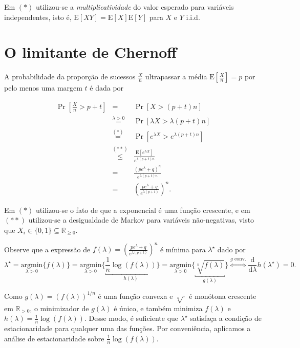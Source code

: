 \documentclass{article}
\begin{document}
Em \((*)\) utilizou-se a \emph{multiplicatividade} do valor esperado para variáveis independentes, isto é, \(\mathrm{E}\left[XY\right] = \mathrm{E}\left[X\right]\mathrm{E}\left[Y\right]\) para \(X\) e \(Y\) i.i.d. 

\newpage

\section*{O limitante de Chernoff}

A probabilidade da proporção de sucessos \(\frac{X}{n}\) ultrapassar a média \(\mathrm E\left[\frac{X}{n}\right] = p\) por pelo menos uma margem \(t\) é dada por

\begin{equation}\label{calc:prob}
	\begin{array}{rcl}
		\Pr\left[\frac{X}{n} > p + t\right] & = & \Pr[X > (p+t)n]\\[1em]
		& \overset{\lambda > 0}{=} & \Pr\left[\lambda X > \lambda (p+t)n\right]\\[1em]
		& \overset{(*)}{=} & \Pr\left[e^{\lambda X} > e^{ \lambda (p+t) n}\right]\\[1em]
		& \overset{(**)}{\leq} & \frac{\mathrm E \left[e^{\lambda X}\right]}{ e^{\lambda(p+t)n}}\\[1em]
		& = & \frac{\left(pe^{\lambda}+q\right)^n}{e^{\lambda(p+t)n}}\\[1em]
		& = & \left(\frac{pe^{\lambda}+q}{e^{\lambda(p+t)}}\right)^n.
	\end{array}
\end{equation}

Em \((*)\) utilizou-se o fato de que a exponencial é uma função crescente, e em \((**)\) utilizou-se a desigualdade de Markov para variáveis não-negativas, visto que \(X_i\in\{0,1\}\subseteq\mathbb{R}_{\geq 0}\).

Observe que a expressão de \(f(\lambda) = \left(\frac{pe^\lambda+q}{e^{\lambda(p+t)}}\right)^n\) é mínima para \(\lambda^\star\) dado por
\[
\lambda^\star = \underset{\lambda > 0}{\mathrm{argmin}}\{f(\lambda)\} = \underset{\lambda > 0}{\mathrm{argmin}}\bigg\{\underbracket{\frac{1}{n}\log(f(\lambda))}_{h(\lambda)}\bigg\} = \underset{\lambda > 0}{\mathrm{argmin}}\{\underbracket{\sqrt[n]{f(\lambda)}}_{g(\lambda)}\}  \overset{g \text{ conv.}}{\iff} \frac{\mathrm d}{\mathrm d\lambda} h(\lambda^\star) = 0. 
\]

Como \(g(\lambda) = (f(\lambda))^{1/n}\) é uma função convexa e \(\sqrt[n]{\cdot}\) é monótona crescente em \(\mathbb{R}_{>0}\), o minimizador de \(g(\lambda)\) é único, e também minimiza \(f(\lambda)\) e \(h(\lambda)=\frac{1}{n}\log(f(\lambda))\). Desse modo, é suficiente que \(\lambda^\star\) satisfaça a condição de estacionaridade para qualquer uma das funções. Por conveniência, aplicamos a análise de estacionaridade sobre \(\frac{1}{n}\log(f(\lambda))\).
\end{document}
